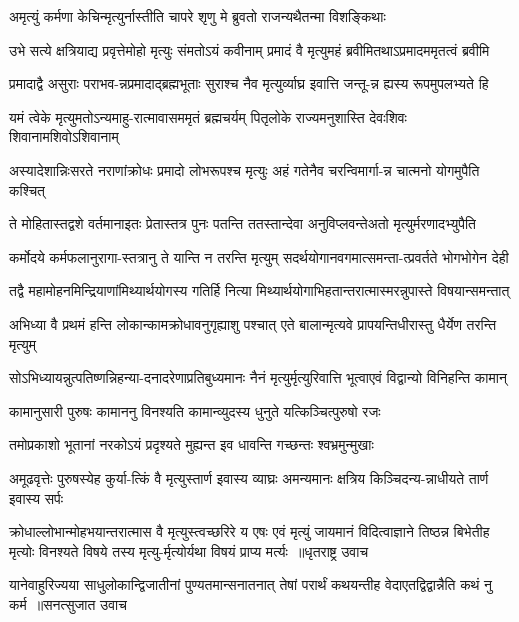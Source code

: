 \twolineshloka
{अमृत्युं कर्मणा केचिन्मृत्युर्नास्तीति चापरे}
{शृणु मे ब्रुवतो राजन्यथैतन्मा विशङ्किथाः}


\twolineshloka
{उभे सत्ये क्षत्रियाद्य प्रवृत्तेमोहो मृत्युः संमतोऽयं कवीनाम्}
{प्रमादं वै मृत्युमहं ब्रवीमितथाऽप्रमादममृतत्वं ब्रवीमि}


\twolineshloka
{प्रमादाद्वै असुराः पराभव-न्नप्रमादाद्ब्रह्मभूताः सुराश्च}
{नैव मृत्युर्व्याघ्र इवात्ति जन्तू-न्न ह्यस्य रूपमुपलभ्यते हि}


\twolineshloka
{यमं त्वेके मृत्युमतोऽन्यमाहु-रात्मावासममृतं ब्रह्मचर्यम्}
{पितृलोके राज्यमनुशास्ति देवःशिवः शिवानामशिवोऽशिवानाम्}


\twolineshloka
{अस्यादेशान्निःसरते नराणांक्रोधः प्रमादो लोभरूपश्च मृत्युः}
{अहं गतेनैव चरन्विमार्गा-न्न चात्मनो योगमुपैति कश्चित्}


\twolineshloka
{ते मोहितास्तद्वशे वर्तमानाइतः प्रेतास्तत्र पुनः पतन्ति}
{ततस्तान्देवा अनुविप्लवन्तेअतो मृत्युर्मरणादभ्युपैति}


\twolineshloka
{कर्मोदये कर्मफलानुरागा-स्तत्रानु ते यान्ति न तरन्ति मृत्युम्}
{सदर्थयोगानवगमात्समन्ता-त्प्रवर्तते भोगभोगेन देही}


\twolineshloka
{तद्वै महामोहनमिन्द्रियाणांमिथ्यार्थयोगस्य गतिर्हि नित्या}
{मिथ्यार्थयोगाभिहतान्तरात्मास्मरन्नुपास्ते विषयान्समन्तात्}


\twolineshloka
{अभिध्या वै प्रथमं हन्ति लोकान्कामक्रोधावनुगृह्याशु पश्चात्}
{एते बालान्मृत्यवे प्रापयन्तिधीरास्तु धैर्येण तरन्ति मृत्युम्}


\twolineshloka
{सोऽभिध्यायन्नुत्पतिष्णन्निहन्या-दनादरेणाप्रतिबुध्यमानः}
{नैनं मृत्युर्मृत्युरिवात्ति भूत्वाएवं विद्वान्यो विनिहन्ति कामान्}


\twolineshloka
{कामानुसारी पुरुषः कामाननु विनश्यति}
{कामान्व्युदस्य धुनुते यत्किञ्चित्पुरुषो रजः}


\twolineshloka
{तमोप्रकाशो भूतानां नरकोऽयं प्रदृश्यते}
{मुह्यन्त इव धावन्ति गच्छन्तः श्वभ्रमुन्मुखाः}


\twolineshloka
{अमूढवृत्तेः पुरुषस्येह कुर्या-त्किं वै मृत्युस्तार्ण इवास्य व्याघ्रः}
{अमन्यमानः क्षत्रिय किञ्चिदन्य-न्नाधीयते तार्ण इवास्य सर्पः}


\fourlineindentedshloka
{क्रोधाल्लोभान्मोहभयान्तरात्मास वै मृत्युस्त्वच्छरिरे य एषः}
{एवं मृत्युं जायमानं विदित्वाज्ञाने तिष्ठन्न बिभेतीह मृत्योः}
{विनश्यते विषये तस्य मृत्यु-र्मृत्योर्यथा विषयं प्राप्य मर्त्यः ॥धृतराष्ट्र उवाच}
{}


\threelineshloka
{यानेवाहुरिज्यया साधुलोकान्द्विजातीनां पुण्यतमान्सनातनात्}
{तेषां परार्थं कथयन्तीह वेदाएतद्विद्वान्नैति कथं नु कर्म ॥सनत्सुजात उवाच}
{}


